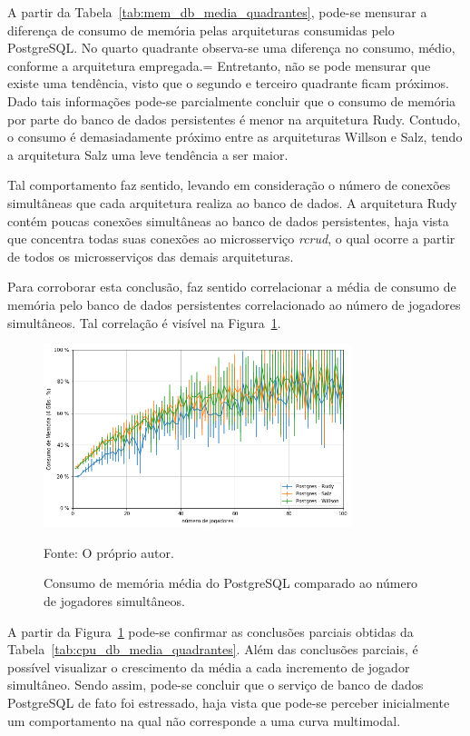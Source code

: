 A partir da Tabela~\ref{tab:mem_db_media_quadrantes}, pode-se mensurar a diferença de consumo de memória pelas arquiteturas consumidas pelo PostgreSQL.
%
No quarto quadrante observa-se uma diferença no consumo, médio, conforme a arquitetura empregada.=
%
Entretanto, não se pode mensurar que existe uma tendência, visto que o segundo e terceiro quadrante ficam próximos.
%
Dado tais informações pode-se parcialmente concluir que o consumo de memória por parte do banco de dados persistentes é menor na arquitetura Rudy.
%
Contudo, o consumo é demasiadamente próximo entre as arquiteturas Willson e Salz, tendo a arquitetura Salz uma leve tendência a ser maior.

Tal comportamento faz sentido, levando em consideração o número de conexões simultâneas que cada arquitetura realiza ao banco de dados.
%
A arquitetura Rudy contém poucas conexões simultâneas ao banco de dados persistentes, haja vista que concentra todas suas conexões ao microsserviço \textit{rcrud}, o qual ocorre a partir de todos os microsserviços das demais arquiteturas.

Para corroborar esta conclusão, faz sentido correlacionar a média de consumo de memória pelo banco de dados persistentes correlacionado ao número de jogadores simultâneos.
%
Tal correlação é visível na Figura~\ref{fig:mem_db_media_por_jogador}.

\begin{figure}[htb!]
  \caption{Consumo de memória média do PostgreSQL comparado ao número de jogadores simultâneos.}
  \label{fig:mem_db_media_por_jogador}
  \includegraphics[width=0.8\textwidth]{figuras/analise/mem_db_media_por_jogador.png}
  \centering

  Fonte: O próprio autor.
\end{figure}

A partir da Figura~\ref{fig:mem_db_media_por_jogador} pode-se confirmar as conclusões parciais obtidas da Tabela~\ref{tab:cpu_db_media_quadrantes}.
%
Além das conclusões parciais, é possível visualizar o crescimento da média a cada incremento de jogador simultâneo.
%
Sendo assim, pode-se concluir que o serviço de banco de dados PostgreSQL de fato foi estressado, haja vista que pode-se perceber inicialmente um comportamento na qual não corresponde a uma curva multimodal.

